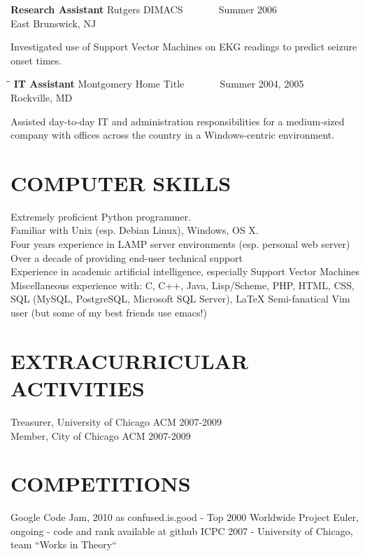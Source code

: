 \documentclass{res}
\begin{document}
\begin{resume}
\begin{tabbing}
   {\bf Research Assistant}  \>Rutgers DIMACS \> ~~~~~~ Summer 2006\\
                          \>East Brunswick, NJ
   \end{tabbing}\vspace{-20pt}
   Investigated use of Support Vector Machines on EKG readings to predict seizure onset times.
   \begin{tabbing}
   \hspace{2.3in}\= \hspace{2.6in}\= \kill %
    {\bf IT Assistant} \>Montgomery Home Title \> ~~~~~~ Summer 2004, 2005\\
                             \>Rockville, MD
   \end{tabbing}\vspace{-20pt}      %
   Assisted day-to-day IT and administration responsibilities for a medium-sized company with offices across the country in a Windows-centric environment. 


\section{COMPUTER SKILLS}          
    Extremely proficient Python programmer. \\
    Familiar with Unix (esp. Debian Linux), Windows, OS X.\\
    Four years experience in LAMP server environments (esp. personal web server)\\
    Over a decade of providing end-user technical support \\
    Experience in academic artificial intelligence, especially Support Vector Machines \\
    Miscellaneous experience with: C, C++, Java, Lisp/Scheme, PHP, HTML, CSS, SQL (MySQL, PostgreSQL, Microsoft SQL Server), \LaTeX
    Semi-fanatical Vim user (but some of my best friends use emacs!)

 
\section{EXTRACURRICULAR ACTIVITIES}          
    Treasurer, University of Chicago ACM 2007-2009 \\         
    Member, City of Chicago ACM 2007-2009

\section{ COMPETITIONS }
    Google Code Jam, 2010 as confused.is.good - Top 2000 Worldwide
    Project Euler, ongoing - code and rank available at github
    ICPC 2007 - University of Chicago, team ``Works in Theory``
 
\end{resume}
\end{document}
